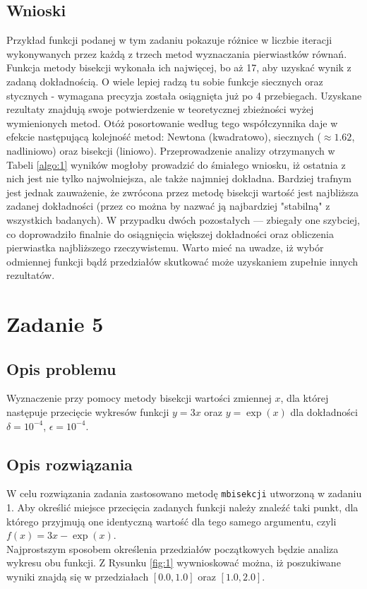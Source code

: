 \documentclass{classrep}
\begin{document}
	\subsection{Wnioski}
		Przykład funkcji podanej w tym zadaniu pokazuje różnice w liczbie iteracji wykonywanych przez każdą z trzech metod wyznaczania pierwiastków równań. Funkcja metody bisekcji wykonała ich najwięcej, bo aż 17, aby uzyskać wynik z zadaną dokładnością. O wiele lepiej radzą tu sobie funkcje siecznych oraz stycznych - wymagana precyzja została osiągnięta już po 4 przebiegach.
		Uzyskane rezultaty znajdują swoje potwierdzenie w teoretycznej zbieżności wyżej wymienionych metod. Otóż posortowanie według tego współczynnika daje w efekcie następującą kolejność metod: Newtona (kwadratowo), siecznych ($\approx 1.62$, nadliniowo) oraz bisekcji (liniowo). 
		Przeprowadzenie analizy otrzymanych w Tabeli \ref{algo:1} wyników mogłoby prowadzić do śmiałego wniosku, iż ostatnia z nich jest nie tylko najwolniejsza, ale także najmniej dokładna. Bardziej trafnym jest jednak zauważenie, że zwrócona przez metodę bisekcji wartość jest najbliższa zadanej dokładności (przez co można by nazwać ją najbardziej "stabilną" z wszystkich badanych). 
		W przypadku dwóch pozostałych --- zbiegały one szybciej, co doprowadziło finalnie do osiągnięcia większej dokładności oraz obliczenia pierwiastka najbliższego rzeczywistemu. Warto mieć na uwadze, iż wybór odmiennej funkcji bądź przedziałów skutkować może uzyskaniem zupełnie innych rezultatów.
		
\section{Zadanie 5}
	\subsection{Opis problemu}
		Wyznaczenie przy pomocy metody bisekcji wartości zmiennej $x$, dla której następuje przecięcie wykresów funkcji $y=3x$ oraz $y=\exp(x)$ dla dokładności $\delta=10^{-4}$, $\epsilon=10^{-4}$.
	
	\subsection{Opis rozwiązania}
		W celu rozwiązania zadania zastosowano metodę \texttt{mbisekcji} utworzoną w zadaniu 1.
		Aby określić miejsce przecięcia zadanych funkcji należy znaleźć taki punkt, dla którego przyjmują one identyczną wartość dla tego samego argumentu, czyli $f(x)=3x-\exp(x)$. 	\\
		 Najprostszym sposobem określenia przedziałów początkowych będzie analiza wykresu obu funkcji. Z Rysunku \ref{fig:1} wywnioskować można, iż poszukiwane wyniki znajdą się w przedziałach $[0.0,1.0]$ oraz $[1.0,2.0]$.
		
\end{document}
